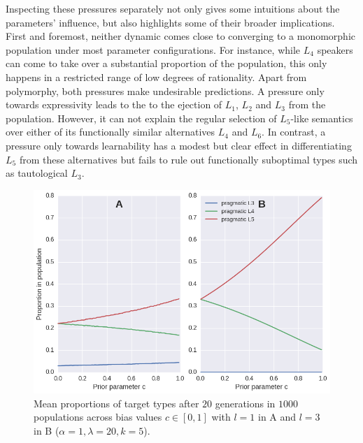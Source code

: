 \documentclass[a4paper]{article}
\begin{document}
Inspecting these pressures separately not only gives some intuitions about the parameters' influence, but also highlights some of their broader implications. First and foremost, neither dynamic comes close to converging to a monomorphic population under most parameter configurations. For instance, while $L_4$ speakers can come to take over a substantial proportion of the population, this only happens in a restricted range of low degrees of rationality. Apart from polymorphy, both pressures make undesirable predictions. A pressure only towards expressivity leads to the to the ejection of $L_1$, $L_2$ and $L_3$ from the population. However, it can not explain the regular selection of $L_5$-like semantics over either of its functionally similar alternatives $L_4$ and $L_6$. In contrast, a pressure only towards learnability has a modest but clear effect in differentiating $L_5$ from these alternatives but fails to rule out functionally suboptimal types such as tautological $L_3$. 

\begin{figure}
\centering
\includegraphics[scale=.5]{./fig2-rmd}
\caption{Mean proportions of target types after $20$ generations in $1000$ populations across bias values $c \in [0,1]$ with $l =1$ in A and $l = 3$ in B ($\alpha =1, \lambda = 20, k = 5$).}
\label{fig:cost}
\end{figure}
\end{document}

